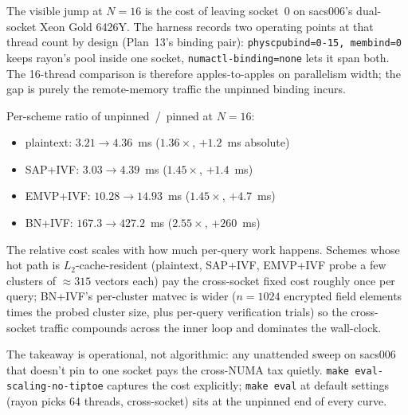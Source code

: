 The visible jump at $N{=}16$ is the cost of leaving socket~0 on
sacs006's dual-socket Xeon Gold 6426Y. The harness records two
operating points at that thread count by design (Plan~13's binding
pair): \texttt{physcpubind=0-15,\,membind=0} keeps rayon's pool
inside one socket, \texttt{numactl-binding=none} lets it span both.
The 16-thread comparison is therefore apples-to-apples on
parallelism width; the gap is purely the remote-memory traffic the
unpinned binding incurs.

Per-scheme ratio of unpinned~/~pinned at $N{=}16$:

\begin{itemize}\setlength{\itemsep}{0pt}
  \item plaintext:  $3.21 \to 4.36$~ms  ($1.36\times$, $+1.2$~ms absolute)
  \item SAP+IVF:    $3.03 \to 4.39$~ms  ($1.45\times$, $+1.4$~ms)
  \item EMVP+IVF:  $10.28 \to 14.93$~ms ($1.45\times$, $+4.7$~ms)
  \item BN+IVF:   $167.3 \to 427.2$~ms  ($2.55\times$, $+260$~ms)
\end{itemize}

The relative cost scales with how much per-query work happens.
Schemes whose hot path is $L_2$-cache-resident (plaintext, SAP+IVF,
EMVP+IVF probe a few clusters of $\approx\!315$ vectors each) pay
the cross-socket fixed cost roughly once per query; BN+IVF's
per-cluster matvec is wider ($n{=}1024$ encrypted field elements
times the probed cluster size, plus per-query verification trials)
so the cross-socket traffic compounds across the inner loop and
dominates the wall-clock.

The takeaway is operational, not algorithmic: any unattended sweep
on sacs006 that doesn't pin to one socket pays the cross-NUMA tax
quietly. \texttt{make eval-scaling-no-tiptoe} captures the cost
explicitly; \texttt{make eval} at default settings (rayon picks 64
threads, cross-socket) sits at the unpinned end of every curve.
